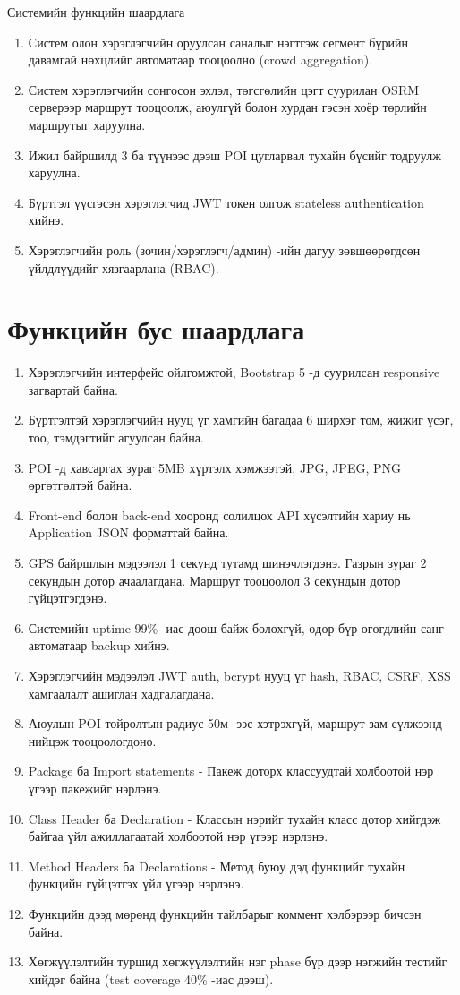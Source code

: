 Системийн функцийн шаардлага
\begin{enumerate}
    \item Систем олон хэрэглэгчийн оруулсан саналыг нэгтгэж сегмент бүрийн давамгай нөхцлийг автоматаар тооцоолно (crowd aggregation).
    \item Систем хэрэглэгчийн сонгосон эхлэл, төгсгөлийн цэгт суурилан OSRM серверээр маршрут тооцоолж, аюулгүй болон хурдан гэсэн хоёр төрлийн маршрутыг харуулна.
    \item Ижил байршилд 3 ба түүнээс дээш POI цугларвал тухайн бүсийг тодруулж харуулна.
    \item Бүртгэл үүсгэсэн хэрэглэгчид JWT токен олгож stateless authentication хийнэ.
    \item Хэрэглэгчийн роль (зочин/хэрэглэгч/админ) -ийн дагуу зөвшөөрөгдсөн үйлдлүүдийг хязгаарлана (RBAC).
\end{enumerate}

\section{Функцийн бус шаардлага}
\begin{enumerate}
    \item Хэрэглэгчийн интерфейс ойлгомжтой, Bootstrap 5 -д суурилсан responsive загвартай байна.
    \item Бүртгэлтэй хэрэглэгчийн нууц үг хамгийн багадаа 6 ширхэг том, жижиг үсэг, тоо, тэмдэгтийг агуулсан байна.
    \item POI -д хавсаргах зураг 5MB хүртэлх хэмжээтэй, JPG, JPEG, PNG өргөтгөлтэй байна.
    \item Front-end болон back-end хооронд солилцох API хүсэлтийн хариу нь Application JSON форматтай байна.
    \item GPS байршлын мэдээлэл 1 секунд тутамд шинэчлэгдэнэ. Газрын зураг 2 секундын дотор ачаалагдана. Маршрут тооцоолол 3 секундын дотор гүйцэтгэгдэнэ.
    \item Системийн uptime 99\% -иас доош байж болохгүй, өдөр бүр өгөгдлийн санг автоматаар backup хийнэ.
    \item Хэрэглэгчийн мэдээлэл JWT auth, bcrypt нууц үг hash, RBAC, CSRF, XSS хамгаалалт ашиглан хадгалагдана.
    \item Аюулын POI тойролтын радиус 50м -ээс хэтрэхгүй, маршрут зам сүлжээнд нийцэж тооцоологдоно.
    \item Package ба Import statements - Пакеж доторх классуудтай холбоотой нэр үгээр пакежийг нэрлэнэ.
    \item Class Header ба Declaration - Классын нэрийг тухайн класс дотор хийгдэж байгаа үйл ажиллагаатай холбоотой нэр үгээр нэрлэнэ.
    \item Method Headers ба Declarations - Метод буюу дэд функцийг тухайн функцийн гүйцэтгэх үйл үгээр нэрлэнэ.
    \item Функцийн дээд мөрөнд функцийн тайлбарыг коммент хэлбэрээр бичсэн байна.
    \item Хөгжүүлэлтийн туршид хөгжүүлэлтийн нэг phase бүр дээр нэгжийн тестийг хийдэг байна (test coverage 40\% -иас дээш).
\end{enumerate}

